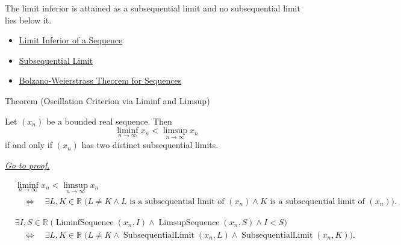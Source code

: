 \begin{remark*}[Interpretation]
The limit inferior is attained as a subsequential limit and no subsequential
limit lies below it.
\end{remark*}

\begin{dependencies}
\begin{itemize}
  \item \hyperref[def:liminf-sequence]{Limit Inferior of a Sequence}
  \item \hyperref[def:subsequential-limit]{Subsequential Limit}
  \item \hyperref[thm:bolzano-weierstrass-sequences]{Bolzano-Weierstrass Theorem for Sequences}
\end{itemize}
\end{dependencies}


\begin{theorembox}{Theorem (Oscillation Criterion via Liminf and Limsup)}
\begin{theorem}
\label{thm:oscillation-criterion-via-liminf-limsup}
Let $(x_n)$ be a bounded real sequence. Then
\[
  \liminf_{n\to\infty}x_n
  <
  \limsup_{n\to\infty}x_n
\]
if and only if $(x_n)$ has two distinct subsequential limits.

\smallskip
\noindent
\hyperref[prf:oscillation-criterion-via-liminf-limsup]{\textit{Go to proof.}}
\end{theorem}
\end{theorembox}

\begin{remark*}
\[
\begin{aligned}
&\liminf_{n\to\infty}x_n<\limsup_{n\to\infty}x_n\\
&\quad\Longleftrightarrow\quad
\exists L,K\in\mathbb{R}\;
\bigl(
  L\ne K
  \land L\text{ is a subsequential limit of }(x_n)
  \land K\text{ is a subsequential limit of }(x_n)
\bigr).
\end{aligned}
\]
\end{remark*}

\begin{remark*}
\[
\begin{aligned}
&\exists I,S\in\mathbb{R}\;
\bigl(
  \operatorname{LiminfSequence}(x_n,I)
  \land
  \operatorname{LimsupSequence}(x_n,S)
  \land I<S
\bigr)\\
&\quad\Longleftrightarrow\quad
\exists L,K\in\mathbb{R}\;
\bigl(
  L\ne K
  \land \operatorname{SubsequentialLimit}(x_n,L)
  \land \operatorname{SubsequentialLimit}(x_n,K)
\bigr).
\end{aligned}
\]
\end{remark*}

